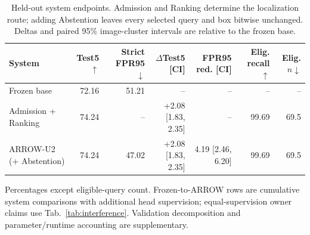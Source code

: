 \begin{table}[t]
\centering
\caption{Held-out system endpoints.  Admission and Ranking determine the
localization route; adding Abstention leaves every selected query and box
bitwise unchanged.  Deltas and paired 95\% image-cluster intervals are relative
to the frozen base.}
\label{tab:headline}
\scriptsize
\setlength{\tabcolsep}{3.1pt}
\begin{tabular}{lrrrrrr}
\toprule
System & Test5$\uparrow$ & Strict FPR95$\downarrow$ & $\Delta$Test5 [CI] & FPR95 red. [CI] & Elig. recall$\uparrow$ & Elig. $n\downarrow$ \\
\midrule
Frozen base & 72.16 & 51.21 & -- & -- & -- & -- \\
Admission + Ranking & 74.24 & -- & +2.08 [1.83, 2.35] & -- & 99.69 & 69.5 \\
ARROW-U2 (+ Abstention) & 74.24 & 47.02 & +2.08 [1.83, 2.35] & 4.19 [2.46, 6.20] & 99.69 & 69.5 \\
\bottomrule
\end{tabular}
\vspace{2pt}
\parbox{0.98\textwidth}{\footnotesize Percentages except eligible-query
count.  Frozen-to-ARROW rows are cumulative system comparisons with additional
head supervision; equal-supervision owner claims use
Tab.~\ref{tab:interference}.  Validation decomposition and parameter/runtime
accounting are supplementary.}
\end{table}
